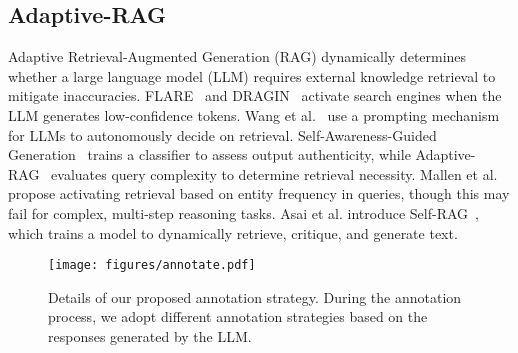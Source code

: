 \subsection{Adaptive-RAG}
Adaptive Retrieval-Augmented Generation (RAG) dynamically determines whether a large language model (LLM) requires external knowledge retrieval to mitigate inaccuracies. FLARE~\cite{jiang2023active} and DRAGIN~\cite{su2024dragin} activate search engines when the LLM generates low-confidence tokens. Wang et al.~\cite{wang2024llms} use a prompting mechanism for LLMs to autonomously decide on retrieval. Self-Awareness-Guided Generation~\cite{wang2023self} trains a classifier to assess output authenticity, while Adaptive-RAG~\cite{jeong2024adaptive} evaluates query complexity to determine retrieval necessity. Mallen et al.~\cite{mallen2023not} propose activating retrieval based on entity frequency in queries, though this may fail for complex, multi-step reasoning tasks. Asai et al. introduce Self-RAG~\cite{asai2023self}, which trains a model to dynamically retrieve, critique, and generate text.



\begin{figure*}[t]
	\centering
	\texttt{[image: figures/annotate.pdf]}
	\caption{Details of our proposed annotation strategy. During the annotation process, we adopt different annotation strategies based on the responses generated by the LLM.}
	\label{annotate}
\end{figure*}